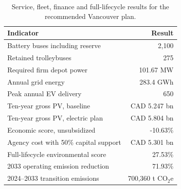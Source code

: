 \begin{table}[htbp]
\centering
\caption{Service, fleet, finance and full-lifecycle results for the recommended Vancouver plan.}
\begin{tabular}{lr}
\toprule
Indicator & Result\\\midrule
Battery buses including reserve & 2,100\\
Retained trolleybuses & 275\\
Required firm depot power & 101.67 MW\\
Annual grid energy & 283.4 GWh\\
Peak annual EV delivery & 650\\
Ten-year gross PV, baseline & CAD 5.247 bn\\
Ten-year gross PV, electric plan & CAD 5.804 bn\\
Economic score, unsubsidized & -10.63\%\\
Agency cost with 50\% capital support & CAD 5.301 bn\\
Full-lifecycle environmental score & 27.53\%\\
2033 operating emission reduction & 71.93\%\\
2024--2033 transition emissions & 700,360 t CO$_2$e\\
\bottomrule
\end{tabular}
\end{table}

